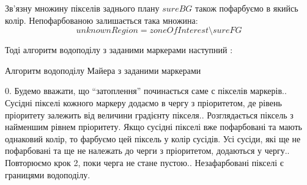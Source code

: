 Зв'язну множину пікселів заднього плану \(sureBG\) також пофарбуємо в якийсь колір. Непофарбованою залишається така множина:
\begin{equation*}
unknownRegion = zoneOfInterest \setminus sureFG
\end{equation*}

Тоді алгоритм водоподілу з заданими маркерами наступний \citep{bib:watershed}:

\begin{megaalgorithm}[H]
	\caption{Алгоритм водоподілу Майера з заданими маркерами}
	
	\BlankLine 
	
	0. Будемо вважати, що \enquote{затоплення} починається саме с пікселів маркерів.. Сусідні пікселі кожного маркеру додаємо в чергу з пріоритетом, де рівень пріоритету залежить від величини градієнту пікселя.. Розглядається піксель з найменшим рівнем пріоритету. Якщо сусідні пікселі вже пофарбовані та мають однаковий колір, то фарбуємо цей піксель у колір сусідів. Усі сусіди, які ще не пофарбовані та ще не належать до черги з пріоритетом, додаються у чергу.. Повторюємо крок 2, поки черга не стане пустою.. Незафарбовані пікселі є границями водоподілу.\;
\end{megaalgorithm}

